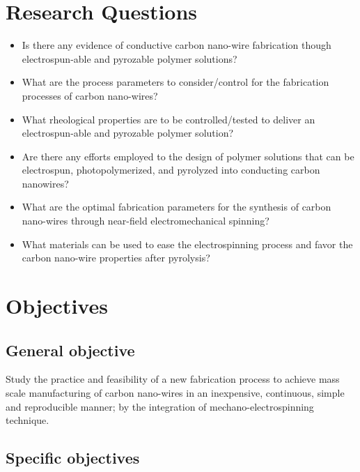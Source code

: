 \section{Research Questions}

\begin{itemize}
	\item{
	Is there any evidence of conductive carbon nano-wire fabrication though electrospun-able and pyrozable polymer solutions?
	}
	\item{
	What are the process parameters to consider/control for the fabrication processes of carbon nano-wires? 
	}
	\item{
	What rheological properties are to be controlled/tested to deliver an electrospun-able and pyrozable polymer solution?	
	}
	\item{
	Are there any efforts employed to the design of polymer solutions that can be electrospun, photopolymerized, and pyrolyzed into conducting carbon nanowires?
	}
	\item{
	What are the optimal fabrication parameters for the synthesis of carbon nano-wires through near-field electromechanical spinning?	
	}
	\item{
	What materials can be used to ease the electrospinning process and favor the carbon nano-wire properties after pyrolysis? 
	}
\end{itemize}

\section{Objectives}

\subsection{General objective}
Study the practice and feasibility of a new fabrication process to achieve mass scale manufacturing of carbon nano-wires in an inexpensive, continuous, simple and reproducible manner; by the integration of mechano-electrospinning technique.

\subsection{Specific objectives}

